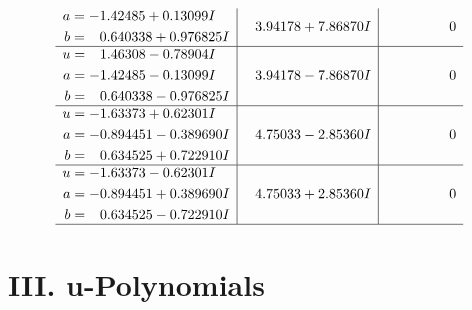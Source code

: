\documentclass[1p]{elsarticle_modified}
\theoremstyle{definition}
\begin{document}
$$\begin{array}{c|c|c}
\begin{aligned}
a &= -1.42485 + 0.13099 I \\
b &= \phantom{-}0.640338 + 0.976825 I\end{aligned}
 & \phantom{-}3.94178 + 7.86870 I & \phantom{-0.000000 } 0 \\ \hline\begin{aligned}
u &= \phantom{-}1.46308 - 0.78904 I \\
a &= -1.42485 - 0.13099 I \\
b &= \phantom{-}0.640338 - 0.976825 I\end{aligned}
 & \phantom{-}3.94178 - 7.86870 I & \phantom{-0.000000 } 0 \\ \hline\begin{aligned}
u &= -1.63373 + 0.62301 I \\
a &= -0.894451 - 0.389690 I \\
b &= \phantom{-}0.634525 + 0.722910 I\end{aligned}
 & \phantom{-}4.75033 - 2.85360 I & \phantom{-0.000000 } 0 \\ \hline\begin{aligned}
u &= -1.63373 - 0.62301 I \\
a &= -0.894451 + 0.389690 I \\
b &= \phantom{-}0.634525 - 0.722910 I\end{aligned}
 & \phantom{-}4.75033 + 2.85360 I & \phantom{-0.000000 } 0\\
 \hline 
 \end{array}$$\newpage
\newpage\renewcommand{\arraystretch}{1}
\centering \section*{ III. u-Polynomials}
\end{document}
